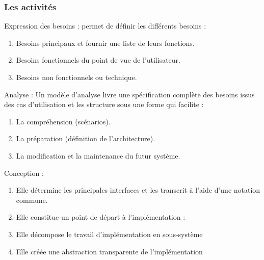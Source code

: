 \documentclass[12pt,a4paper]{report}
\begin{document}
\subsubsection{ Les activit\'{e}s}

\noindent \begin{flushleft}
	Expression des besoins : permet de d\'{e}finir les diff\'{e}rents besoins :
\end{flushleft}

\begin{enumerate}
	\item  Besoins principaux et fournir une liste de leurs fonctions.
	
	\item  Besoins fonctionnels du point de vue de l'utilisateur.
	
	\item  Besoins non fonctionnels ou technique.
\end{enumerate}

\noindent \begin{flushleft}
	
	
	\noindent 
	
	\noindent Analyse : Un mod\`{e}le d'analyse livre une sp\'{e}cification compl\`{e}te des besoins issus des cas d'utilisation et les structure sous une forme qui facilite :
\end{flushleft}

\begin{enumerate}
	\item  La compr\'{e}hension (sc\'{e}narios).
	
	\item  La pr\'{e}paration (d\'{e}finition de l'architecture).
	
	\item  La modification et la maintenance du futur syst\`{e}me.
\end{enumerate}

\noindent \begin{flushleft}
	
	
	\noindent 
	
	\noindent Conception :
\end{flushleft}

\begin{enumerate}
	\item  Elle d\'{e}termine les principales interfaces et les transcrit \`{a} l'aide d'une notation commune.
	
	\item  Elle constitue un point de d\'{e}part \`{a} l'impl\'{e}mentation :
	
	\item  Elle d\'{e}compose le travail d'impl\'{e}mentation en sous-syst\`{e}me
	
	\item  Elle cr\'{e}\'{e}e une abstraction transparente de l'impl\'{e}mentation
\end{enumerate}
\end{document}
